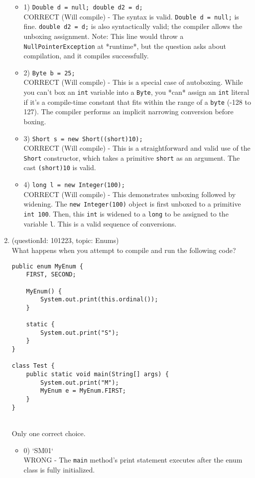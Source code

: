 \documentclass[12pt]{article}
\begin{document}
\begin{enumerate}[label=(\arabic*)]
\begin{itemize}
\item 1) \verb|Double d = null; double d2 = d;|
 \\ 
CORRECT (Will compile) - The syntax is valid. \verb|Double d = null;| is fine. \verb|double d2 = d;| is also syntactically valid; the compiler allows the unboxing assignment. Note: This line would throw a \verb|NullPointerException| at *runtime*, but the question asks about compilation, and it compiles successfully.

\item 2) \verb|Byte b = 25; |
 \\ 
CORRECT (Will compile) - This is a special case of autoboxing. While you can't box an \verb|int| variable into a \verb|Byte|, you *can* assign an \verb|int| literal if it's a compile-time constant that fits within the range of a \verb|byte| (-128 to 127). The compiler performs an implicit narrowing conversion before boxing.

\item 3) \verb|Short s = new Short((short)10);|
 \\ 
CORRECT (Will compile) - This is a straightforward and valid use of the \verb|Short| constructor, which takes a primitive \verb|short| as an argument. The cast \verb|(short)10| is valid.

\item 4) \verb|long l = new Integer(100);|
 \\ 
CORRECT (Will compile) - This demonstrates unboxing followed by widening. The \verb|new Integer(100)| object is first unboxed to a primitive \verb|int 100|. Then, this \verb|int| is widened to a \verb|long| to be assigned to the variable \verb|l|. This is a valid sequence of conversions.

\end{itemize}
\item (questionId: 101223, topic: Enums) \\ 
What happens when you attempt to compile and run the following code?
\begin{verbatim}
public enum MyEnum {
    FIRST, SECOND;
    
    MyEnum() {
        System.out.print(this.ordinal());
    }
    
    static {
        System.out.print("S");
    }
}

class Test {
    public static void main(String[] args) {
        System.out.print("M");
        MyEnum e = MyEnum.FIRST;
    }
}
\end{verbatim}
\\ \noindent Only one correct choice. 
\begin{itemize}
\item 0) `SM01`
 \\ 
WRONG - The \verb|main| method's print statement executes after the enum class is fully initialized.


\end{itemize}
\end{enumerate}
\end{document}
